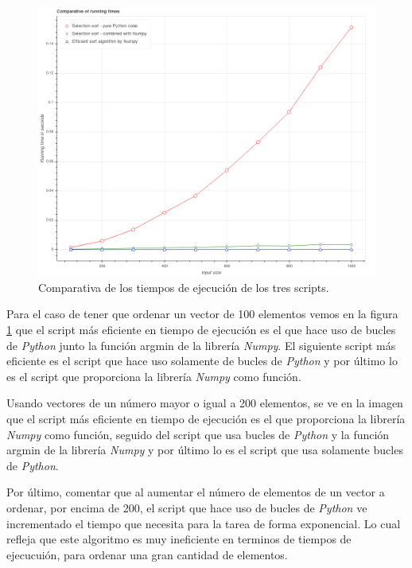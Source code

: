 \documentclass[12pt,twoside]{article}
\begin{document}
\begin{figure}[hbt]
\begin{center}
	\includegraphics[width=1\textwidth]{11.png}
	\caption{Comparativa de los tiempos de ejecución de los tres scripts.}
	\label{fig:fig1}
\end{center}
\end{figure}

Para el caso de tener que ordenar un vector de 100 elementos vemos en la figura \ref{fig:fig1} que el script más eficiente en tiempo de ejecución es el que hace uso de bucles de \textit{\textit{\textit{Python}}} junto la función argmin de la librería \textit{Numpy}. El siguiente  script más eficiente es el script que hace uso solamente de bucles de \textit{\textit{\textit{Python}}} y por último lo es el script que proporciona la librería \textit{Numpy} como función.

Usando vectores de un número mayor o igual a 200 elementos, se ve en la imagen que el script más eficiente en tiempo de ejecución es el que proporciona la librería \textit{Numpy} como función, seguido del script que usa bucles de \textit{\textit{\textit{Python}}} y la función argmin de la librería \textit{Numpy} y por último lo es el script que usa solamente bucles de \textit{\textit{\textit{Python}}}.

Por último, comentar que al aumentar el número de elementos de un vector a ordenar, por encima de 200, el script que hace uso de bucles de \textit{Python} ve incrementado el tiempo que necesita para la tarea de forma exponencial. Lo cual refleja que este algoritmo es muy ineficiente en terminos de tiempos de ejecucuión, para ordenar una gran cantidad de elementos.
 
\end{document}
